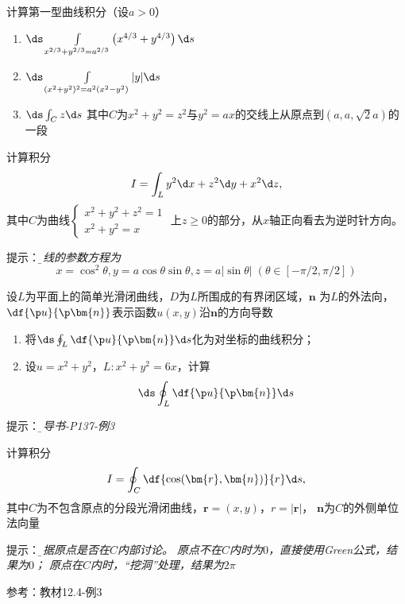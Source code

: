 \begin{frame}
	\linespread{1.2}
	计算第一型曲线积分（设$a>0$）
	\begin{enumerate}[(1)]
	  \item $\ds\int\limits_{x^{2/3}+y^{2/3}=a^{2/3}}
	  \left(x^{4/3}+y^{4/3}\right)\d s$
	  \item $\ds\int\limits_{(x^2+y^2)^2=a^2(x^2-y^2)}|y|\d s$
	  \item $\ds\int_Cz\d s$
	  其中$C$为$x^2+y^2=z^2$与$y^2=ax$的交线上从原点到$(a,a,\sqrt2a)$的一段
	\end{enumerate}
		
\end{frame}

\begin{frame}
	\linespread{1.2}
	计算积分
	$$I=\int_Ly^2\d x+z^2\d y+x^2\d z,$$
	其中$C$为曲线$\left\{\begin{array}{l}
	x^2+y^2+z^2=1 \\ x^2+y^2=x
	\end{array}\right.$
	上$z\geq 0$的部分，从$x$轴正向看去为逆时针方向。
		
	\bigskip\pause
	\alert{提示：}{\it\b 曲线的参数方程为 
	$$x=\cos^2\theta,y=a\cos\theta\sin\theta, z=a|\sin\theta|\;
	(\theta\in[-\pi/2,\pi/2])$$
	}
\end{frame}

\begin{frame}
	\linespread{1.2}
	设$L$为平面上的简单光滑闭曲线，$D$为$L$所围成的有界闭区域，$\bm{n}$
	为$L$的外法向，$\df{\p u}{\p\bm{n}}$表示函数$u(x,y)$沿$\bm{n}$的方向导数
	\begin{enumerate}[(1)]
	  \item 将$\ds\oint_L\df{\p u}{\p\bm{n}}\d s$化为对坐标的曲线积分；
	  \item 设$u=x^2+y^2$，$L:x^2+y^2=6x$，计算
	  $$\ds\oint_L\df{\p u}{\p\bm{n}}\d s$$
	\end{enumerate}
		
	\bigskip\pause
	\alert{提示：}{\it\b 辅导书-P137-例3}
\end{frame}

\begin{frame}
	\linespread{1.2}
	计算积分
	$$I=\oint_C\df{\cos(\bm{r},\bm{n})}{r}\d s,$$
	其中$C$为不包含原点的分段光滑闭曲线，$\bm{r}=(x,y)$，$r=|\bm{r}|$，
	$\bm{n}$为$C$的外侧单位法向量
		
	\bigskip\pause
	\alert{提示：}{\it\b 根据原点是否在$C$内部讨论。
	原点不在$C$内时为$0$，直接使用Green公式，结果为$0$；
	原点在$C$内时，“挖洞”处理，结果为$2\pi$}
	
	\alert{参考：教材12.4-例3}
\end{frame}

